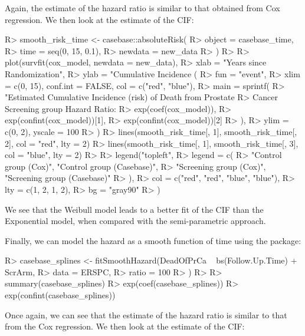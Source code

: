 \documentclass[
]{jss}
\begin{document}
Again, the estimate of the hazard ratio is similar to that obtained from
Cox regression. We then look at the estimate of the CIF:

\begin{CodeChunk}

\begin{CodeInput}
R> smooth_risk_time <- casebase::absoluteRisk(
R>   object = casebase_time,
R>   time = seq(0, 15, 0.1),
R>   newdata = new_data
R> )
R> 
R> plot(survfit(cox_model, newdata = new_data),
R>   xlab = "Years since Randomization",
R>   ylab = "Cumulative Incidence (%
R>   fun = "event",
R>   xlim = c(0, 15), conf.int = FALSE, col = c("red", "blue"),
R>   main = sprintf(
R>     "Estimated Cumulative Incidence (risk) of Death from Prostate 
R>                     Cancer Screening group Hazard Ratio: %
R>     exp(coef(cox_model)),
R>     exp(confint(cox_model))[1],
R>     exp(confint(cox_model))[2]
R>   ),
R>   ylim = c(0, 2), yscale = 100
R> )
R> lines(smooth_risk_time[, 1], smooth_risk_time[, 2], col = "red", lty = 2)
R> lines(smooth_risk_time[, 1], smooth_risk_time[, 3], col = "blue", lty = 2)
R> 
R> legend("topleft",
R>   legend = c(
R>     "Control group (Cox)", "Control group (Casebase)",
R>     "Screening group (Cox)", "Screening group (Casebase)"
R>   ),
R>   col = c("red", "red", "blue", "blue"),
R>   lty = c(1, 2, 1, 2),
R>   bg = "gray90"
R> )
\end{CodeInput}
\end{CodeChunk}

We see that the Weibull model leads to a better fit of the CIF than the
Exponential model, when compared with the semi-parametric approach.

Finally, we can model the hazard as a smooth function of time using the
 package:

\begin{CodeChunk}

\begin{CodeInput}
R> casebase_splines <- fitSmoothHazard(DeadOfPrCa ~ bs(Follow.Up.Time) + ScrArm,
R>   data = ERSPC,
R>   ratio = 100
R> )
R> 
R> summary(casebase_splines)
R> exp(coef(casebase_splines))
R> exp(confint(casebase_splines))
\end{CodeInput}
\end{CodeChunk}

Once again, we can see that the estimate of the hazard ratio is similar
to that from the Cox regression. We then look at the estimate of the
CIF:
\end{document}
